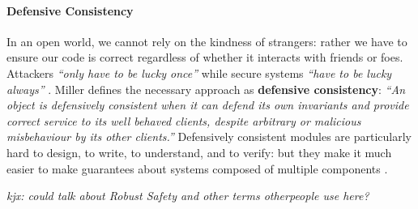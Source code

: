 
\paragraph{Defensive Consistency}


In an open world, we cannot rely on the kindness of strangers: rather
we have to ensure our code is correct regardless of whether it
interacts with friends or foes.
Attackers 
\textit{``only have to be lucky once''} while secure systems 
\textit{``have to be lucky always''} \cite{IRAThatcher}.
Miller \cite{miller-esop2013,MillerPhD} defines the necessary approach
as \textbf{defensive consistency}: \textit{``An object is defensively
  consistent when it can defend its own invariants and provide correct
  service to its well behaved clients, despite arbitrary or malicious
  misbehaviour by its other clients.''}  Defensively consistent
modules are particularly hard to design, to write, to understand, and
to verify: but
they make it much
easier to make guarantees about systems composed of multiple components
\cite{Murray10dphil}.

\textit{kjx: could talk about Robust Safety and other terms
  otherpeople use here?}



